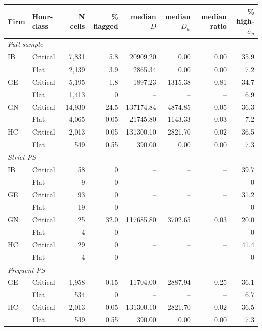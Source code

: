 \begin{tabular}{@{}l l r r r r r r@{}}
\toprule
Firm & Hour-class & N cells & \% flagged & median $D$ & median $D_w$ & median ratio & \% high-$\sigma_{p}$ \\
\midrule
\multicolumn{8}{l}{\textit{Full sample}} \\
IB & Critical & 7,831 & 5.8 & 20909.20 & 0.00 & 0.00 & 35.9 \\
 & Flat & 2,139 & 3.9 & 2865.34 & 0.00 & 0.00 & 7.2 \\
GE & Critical & 5,195 & 1.8 & 1897.23 & 1315.38 & 0.81 & 34.7 \\
 & Flat & 1,413 & 0 & -- & -- & -- & 6.9 \\
GN & Critical & 14,930 & 24.5 & 137174.84 & 4874.85 & 0.05 & 36.3 \\
 & Flat & 4,065 & 0.05 & 21745.80 & 1143.33 & 0.03 & 7.2 \\
HC & Critical & 2,013 & 0.05 & 131300.10 & 2821.70 & 0.02 & 36.5 \\
 & Flat & 549 & 0.55 & 390.00 & 0.00 & 0.00 & 7.3 \\
\midrule
\multicolumn{8}{l}{\textit{Strict PS}} \\
IB & Critical & 58 & 0 & -- & -- & -- & 39.7 \\
 & Flat & 9 & 0 & -- & -- & -- & 0 \\
GE & Critical & 93 & 0 & -- & -- & -- & 31.2 \\
 & Flat & 19 & 0 & -- & -- & -- & 0 \\
GN & Critical & 25 & 32.0 & 117685.80 & 3702.65 & 0.03 & 20.0 \\
 & Flat & 4 & 0 & -- & -- & -- & 0 \\
HC & Critical & 29 & 0 & -- & -- & -- & 41.4 \\
 & Flat & 4 & 0 & -- & -- & -- & 0 \\
\midrule
\multicolumn{8}{l}{\textit{Frequent PS}} \\
GE & Critical & 1,958 & 0.15 & 11704.00 & 2887.94 & 0.25 & 36.1 \\
 & Flat & 534 & 0 & -- & -- & -- & 6.7 \\
HC & Critical & 2,013 & 0.05 & 131300.10 & 2821.70 & 0.02 & 36.5 \\
 & Flat & 549 & 0.55 & 390.00 & 0.00 & 0.00 & 7.3 \\
\bottomrule
\end{tabular}
